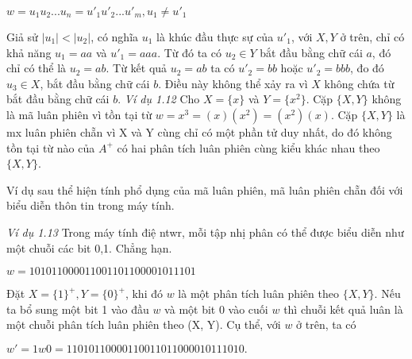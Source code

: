$w = u_1u_2...u_n = u'_1u'_2...u'_m, u_1 \ne u'_1$
\begin{flushleft}
Giả sử $|u_1| < |u_2|$, có nghĩa $u_1$ là khúc đầu thực sự của $u'_1$, với $X,Y$ ở trên, chỉ có khả năng $u_1 = aa$ và $u'_1 = aaa$. Từ đó ta có $u_2 \in Y$ bắt đầu bằng chữ cái $a$, đó chỉ có thể là $u_2 = ab$. Từ kết quả $u_2 = ab$ ta có $u'_2 = bb$ hoặc $u'_2 = bbb$, đo đó $u_3 \in X$, bắt đầu bằng chữ cái $b$. Điều này không thể xảy ra vì $X$ không chứa từ bắt đầu bằng chữ cái $b$.
\textit{Ví dụ 1.12}     Cho $X = \{x\}$ và $Y = \{x^2\}$. Cặp $\{ X,Y \}$ không là mã luân phiên vì tồn tại từ $w = x^3 = (x)(x^2) = (x^2)(x)$. Cặp $\{ X,Y \}$ là mx luân phiên chẵn vì X và Y cùng chỉ có một phần tử duy nhất, do đó không tồn tại từ nào của $A^+$ có hai phân tích luân phiên cùng kiểu khác nhau theo $\{ X,Y \}$.

\hspace{10mm} Ví dụ sau thể hiện tính phổ dụng của mã luân phiên, mã luân phiên chẵn đối với biểu diễn thôn tin trong máy tính.

\hspace{10mm}\textit{Ví dụ 1.13}    Trong máy tính điệ ntwr, mỗi tập nhị phân có thể được biểu diễn như một chuỗi các bit 0,1. Chẳng hạn.
\end{flushleft}
$w = 101011000011001101100001011101$
\begin{flushleft}
\hspace{10mm}Đặt $X = \{ 1 \}^+, Y = \{0\}^+$, khi đó $w$ là một phân tích luân phiên theo $\{ X,Y \}$. Nếu ta bổ sung một bit 1 vào đầu $w$ và một bit 0 vào cuối $w$ thì chuỗi kết quả luân là một chuỗi phân tích luân phiên theo (X, Y). Cụ thể, với $w$ ở trên, ta có 
\end{flushleft}
$w' = 1w0 = 11010110000110011011000010111010.$
